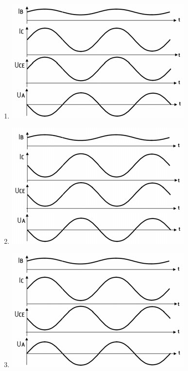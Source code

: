 \documentclass[8pt]{article}
\begin{document}
\begin{enumerate}
\begin{enumerate}[nolistsep,label=\Alph*]
{\begin{enumerate}[nolistsep,label=\Alph*]
\begin{enumerate}[nolistsep,label=\Alph*]
\begin{center}
\begin{minipage}{\linewidth}
		\end{minipage}
	\end{center}
\item
	\begin{center}
		\begin{minipage}{\linewidth}
			\centering
			\includegraphics[scale=1.0]{pics/tc626_d.jpg}
		\end{minipage}
	\end{center}
\item
	\begin{center}
		\begin{minipage}{\linewidth}
			\centering
			\includegraphics[scale=1.0]{pics/tc626_e.jpg}
		\end{minipage}
	\end{center}
\item
	\begin{center}
		\begin{minipage}{\linewidth}
			\centering
			\includegraphics[scale=1.0]{pics/tc626_f.jpg}
		\end{minipage}
	\end{center}
\end{enumerate}


\end{enumerate}}
\end{enumerate}
\end{enumerate}
\end{document}
